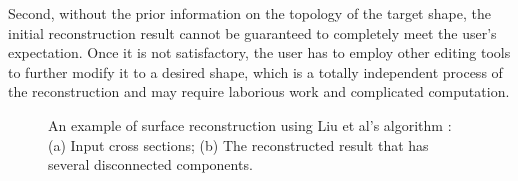 Second, without the  prior information on the topology of the
target shape, the initial reconstruction result cannot be
guaranteed to completely meet the user's expectation. Once it is
not satisfactory, the user has to employ other editing tools to
further modify it to a desired shape, which is a totally
independent process of the reconstruction and may require laborious
work and complicated computation.

\begin{figure} [htbp]
  \centering
  \caption{An example of surface reconstruction using Liu et al's
  algorithm \cite{LBDLJ08}:
  (a) Input cross sections;
  (b) The reconstructed result that has several disconnected components.}
  \label{fig:anatomy-ju}
\end{figure}

